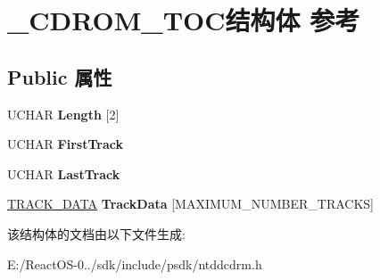 \hypertarget{struct___c_d_r_o_m___t_o_c}{}\section{\+\_\+\+C\+D\+R\+O\+M\+\_\+\+T\+O\+C结构体 参考}
\label{struct___c_d_r_o_m___t_o_c}
\subsection*{Public 属性}
\begin{DoxyCompactItemize}
\item 
\mbox{\label{struct___c_d_r_o_m___t_o_c_af0cfeedfbd90be3d1efb9d2c92111a7a}} 
U\+C\+H\+AR {\bfseries Length} \mbox{[}2\mbox{]}
\item 
\mbox{\label{struct___c_d_r_o_m___t_o_c_a7c7dfadcdc005ede479c4b50ba15d16d}} 
U\+C\+H\+AR {\bfseries First\+Track}
\item 
\mbox{\label{struct___c_d_r_o_m___t_o_c_a59e7b950eec84124c5bcb53fcc5a6ccc}} 
U\+C\+H\+AR {\bfseries Last\+Track}
\item 
\mbox{\label{struct___c_d_r_o_m___t_o_c_a37ff15b738b481e3fec516f866647ab9}} 
\hyperlink{struct___t_r_a_c_k___d_a_t_a}{T\+R\+A\+C\+K\+\_\+\+D\+A\+TA} {\bfseries Track\+Data} \mbox{[}M\+A\+X\+I\+M\+U\+M\+\_\+\+N\+U\+M\+B\+E\+R\+\_\+\+T\+R\+A\+C\+KS\mbox{]}
\end{DoxyCompactItemize}


该结构体的文档由以下文件生成\+:\begin{DoxyCompactItemize}
\item 
E\+:/\+React\+O\+S-\/0../sdk/include/psdk/ntddcdrm.\+h\end{DoxyCompactItemize}
